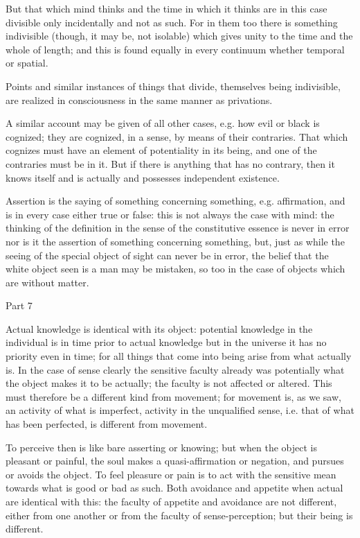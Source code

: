 But that which mind thinks and the time in which it thinks are in
this case divisible only incidentally and not as such. For in them
too there is something indivisible (though, it may be, not isolable)
which gives unity to the time and the whole of length; and this is
found equally in every continuum whether temporal or spatial.

Points and similar instances of things that divide, themselves being
indivisible, are realized in consciousness in the same manner as privations.

A similar account may be given of all other cases, e.g. how evil or
black is cognized; they are cognized, in a sense, by means of their
contraries. That which cognizes must have an element of potentiality
in its being, and one of the contraries must be in it. But if there
is anything that has no contrary, then it knows itself and is actually
and possesses independent existence. 

Assertion is the saying of something concerning something, e.g. affirmation,
and is in every case either true or false: this is not always the
case with mind: the thinking of the definition in the sense of the
constitutive essence is never in error nor is it the assertion of
something concerning something, but, just as while the seeing of the
special object of sight can never be in error, the belief that the
white object seen is a man may be mistaken, so too in the case of
objects which are without matter. 

Part 7

Actual knowledge is identical with its object: potential knowledge
in the individual is in time prior to actual knowledge but in the
universe it has no priority even in time; for all things that come
into being arise from what actually is. In the case of sense clearly
the sensitive faculty already was potentially what the object makes
it to be actually; the faculty is not affected or altered. This must
therefore be a different kind from movement; for movement is, as we
saw, an activity of what is imperfect, activity in the unqualified
sense, i.e. that of what has been perfected, is different from movement.

To perceive then is like bare asserting or knowing; but when the object
is pleasant or painful, the soul makes a quasi-affirmation or negation,
and pursues or avoids the object. To feel pleasure or pain is to act
with the sensitive mean towards what is good or bad as such. Both
avoidance and appetite when actual are identical with this: the faculty
of appetite and avoidance are not different, either from one another
or from the faculty of sense-perception; but their being is different.


